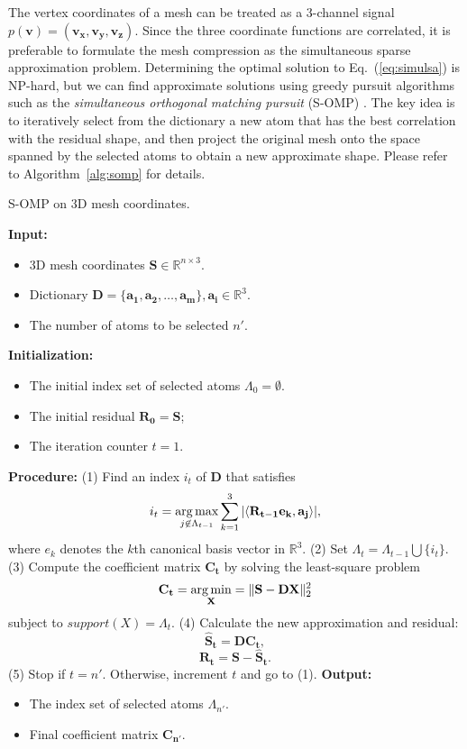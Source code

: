 The vertex coordinates of a mesh can be treated as a 3-channel signal
$p(\mathbf{v})=(\mathbf{v_x}, \mathbf{v_y}, \mathbf{v_z})$. Since the
three coordinate functions are correlated, it is preferable to
formulate the mesh compression as the simultaneous sparse
approximation problem. Determining the optimal solution to
Eq.~(\ref{eq:simulsa}) is NP-hard, but we can find approximate
solutions using greedy pursuit algorithms such as the
\emph{simultaneous orthogonal matching pursuit} (S-OMP)
\cite{Tropp2006a}. The key idea is to iteratively select
from the dictionary a new atom that has the best correlation with the
residual shape, and then project the original mesh onto the space
spanned by the selected atoms to obtain a new approximate shape.
Please refer to Algorithm~\ref{alg:somp} for details.
\begin{algorithm}
\caption{S-OMP on 3D mesh coordinates.}
\label{alg:somp}
\begin{algorithmic}
\STATE \textbf{Input:}
\STATE \begin{itemize}
         \item 3D mesh coordinates $\mathbf{S}\in\mathbb{R}^{n\times 3}$.
         \item Dictionary $\mathbf{D}=\{\mathbf{a_1},\mathbf{a_2},\ldots,\mathbf{a_m}\}, \mathbf{a_i}\in\mathbb{R}^3$.
         \item The number of atoms to be selected $n'$.
       \end{itemize}
\STATE \textbf{Initialization:}
\STATE \begin{itemize}
         \item The initial index set of selected atoms $\Lambda_0=\emptyset$.
         \item The initial residual $\mathbf{R_0}=\mathbf{S}$;
         \item The iteration counter $t=1$.
       \end{itemize}
\STATE \textbf{Procedure:}
\STATE (1) Find an index $i_t$ of $\mathbf{D}$ that satisfies
    $$ i_t = \operatorname*{arg\,max}_{j\not\in\Lambda_{t-1}} \sum_{k=1}^3 |\langle \mathbf{R_{t-1}}\mathbf{e_k}, \mathbf{a_j} \rangle|, $$
    where $e_k$ denotes the $k$th canonical basis vector in $\mathbb{R}^3$.
\STATE (2) Set $\Lambda_t=\Lambda_{t-1}\bigcup\{i_t\}$.
\STATE (3) Compute the coefficient matrix $\mathbf{C_t}$ by solving the least-square problem
    $$ \mathbf{C_t}=\operatorname*{arg\,min}_{\mathbf{X}}=\|\mathbf{S}-\mathbf{D}\mathbf{\mathbf{X}}\|_2^2$$
    subject to $support(X)=\Lambda_t.$
\STATE (4) Calculate the new approximation and residual:
    $$ \mathbf{\widehat{S}_t} = \mathbf{D}\mathbf{C_t}, $$
    $$ \mathbf{R_t} = \mathbf{S} - \mathbf{\widehat{S}_t}. $$
\STATE (5) Stop if $t=n'$. Otherwise, increment $t$ and go to (1).
\STATE \textbf{Output:}
\STATE \begin{itemize}
         \item The index set of selected atoms $\Lambda_{n'}$.
         \item Final coefficient matrix $\mathbf{C_{n'}}$.
        \end{itemize}
\end{algorithmic}
\end{algorithm}

